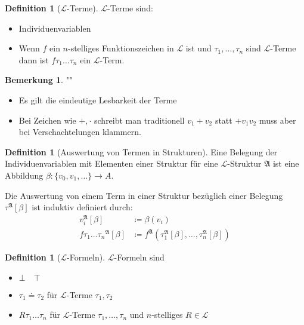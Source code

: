\documentclass[12pt,parskip=full]{scrartcl}
\theoremstyle{definition}
\newtheorem{definition}[theorem]{Definition}
\newtheorem{remark}[theorem]{Bemerkung}
\begin{document}
	\begin{definition}[$\mathcal{L}$-Terme]
		$\mathcal{L}$-Terme sind:
		\begin{itemize}
			\item Individuenvariablen
			\item Wenn $f$ ein $n$-stelliges Funktionszeichen in $\mathcal{L}$ ist und $\tau_1, \dots, \tau_n$ sind $\mathcal{L}$-Terme dann ist $f \tau_1 \dots \tau_n$ ein $\mathcal{L}$-Term.
		\end{itemize}
	\end{definition}

	\begin{remark}""
		\begin{itemize}
			\item Es gilt die eindeutige Lesbarkeit der Terme
			\item Bei Zeichen wie $+, \cdot$ schreibt man traditionell $v_1 + v_2$ statt $+ v_1 v_2$ muss aber bei Verschachtelungen klammern.
		\end{itemize}
	\end{remark}

	\begin{definition}[Auswertung von Termen in Strukturen]
		Eine Belegung der Individuenvariablen mit Elementen einer Struktur für eine $\mathcal{L}$-Struktur $\mathfrak{A}$ ist eine Abbildung $\beta: \{ v_0, v_1, \dots \} \to A$.
		
		Die Auswertung von einem Term in einer Struktur bezüglich einer Belegung $\tau^\mathfrak{A}[\beta]$ ist induktiv definiert durch:
		\begin{align*}
			v_i^\mathfrak{A}[\beta] &\coloneqq \beta(v_i) \\
			f \tau_1 \dots \tau_n {}^\mathfrak{A} [\beta] &\coloneqq f^\mathfrak{A}(\tau_1^\mathfrak{A}[\beta], \dots, \tau_n^\mathfrak{A}[\beta])
		\end{align*}
	\end{definition}

	\begin{definition}[$\mathcal{L}$-Formeln]
		$\mathcal{L}$-Formeln sind
		\begin{itemize}
			\item $\bot \quad \top$
			\item $\tau_1 \doteq \tau_2$ für $\mathcal{L}$-Terme $\tau_1, \tau_2$
			\item $R \tau_1 \dots \tau_n$ für $\mathcal{L}$-Terme $\tau_1, \dots, \tau_n$ und $n$-stelliges $R \in \mathcal{L}$
		\end{itemize}
	\end{definition}
\end{document}
